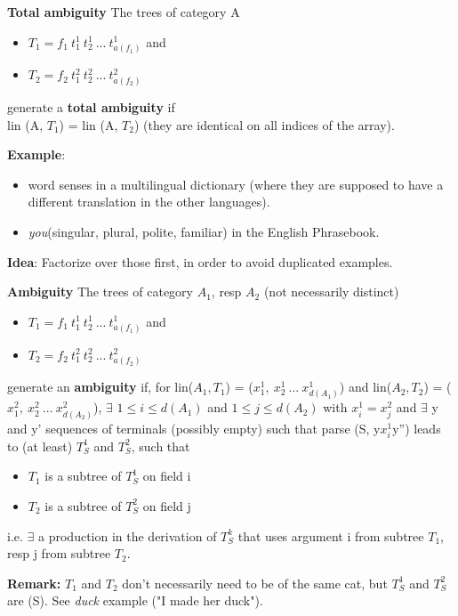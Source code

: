 \documentclass[]{article}
\begin{document}
\textbf{Total ambiguity}
The trees of category A
\begin{itemize}
\item $T_1 = f_1\ t_1^1\ t_2^1\ ...\ t_{a(f_1)}^1$ and
\item $T_2 = f_2\ t_1^2\ t_2^2\ ...\ t_{a(f_2)}^2$
\end{itemize}
generate a \textbf{total ambiguity} if \\
lin (A, $T_1$) = lin (A, $T_2$) (they are identical on all indices of
the array).

\textbf{Example}: 
\begin{itemize}
\item word senses in a multilingual dictionary (where they are
supposed to have a different translation in the other languages). 
\item {\it you}(singular, plural, polite, familiar) in the English Phrasebook.
\end{itemize}


\textbf{Idea}:
Factorize over those first, in order to avoid duplicated examples.

\vspace{10mm}

\textbf{Ambiguity}
The trees of category $A_1$, resp $A_2$ (not necessarily distinct) 
\begin{itemize}
\item $T_1 = f_1\ t_1^1\ t_2^1\ ...\ t_{a(f_1)}^1$ and
\item $T_2 = f_2\ t_1^2\ t_2^2\ ...\ t_{a(f_2)}^2$
\end{itemize}
generate an \textbf{ambiguity} if, for 
lin($A_1, T_1$) = ($x_1^1,\ x_2^1\ ...\ x_{d(A_1)}^1$) and 
lin($A_2, T_2$) = ($x_1^2,\ x_2^2\ ...\ x_{d(A_2)}^2$),
$\exists$ $1 \leq i \leq d(A_1)$ and $1 \leq j \leq d(A_2)$ with
\textbf{$x_i^1 = x_j^2$} and $\exists$ y and y' sequences of terminals
(possibly empty) such that
parse (S, y$x_i^1$y'') leads to (at least) $T_S^1$ and $T_S^2$, such
that
\begin{itemize}
\item $T_1$ is a subtree of $T_S^1$ on field i
\item $T_2$ is a subtree of $T_S^2$ on field j
\end{itemize}

i.e. $\exists$ a production in the derivation of $T_S^k$ that uses
argument i from subtree $T_1$, resp j from subtree $T_2$. 

\textbf{Remark:}
$T_1$ and $T_2$ don't necessarily need to be of the same cat, but
$T_S^1$ and $T_S^2$ are (S). See {\it duck} example ("I made her
duck").
\end{document}
